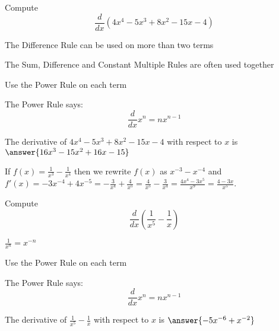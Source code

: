\documentclass[handout]{ximera}
\begin{document}
\begin{problem} %
  Compute 
  \[
  \frac{d}{dx} \left(4x^4 - 5x^3 + 8x^2 - 15x - 4\right)
  \]
  
    \begin{hint}
		  The Difference Rule can be used on more than two terms
		\end{hint}
		\begin{hint}
		  The Sum, Difference and Constant Multiple Rules are often used together 
		\end{hint}
		\begin{hint}
      Use the Power Rule on each term
    \end{hint}
    \begin{hint}
      The Power Rule says:
      \[
      \frac{d}{dx} x^n = nx^{n-1}
      \]
    \end{hint}    
		The derivative of $4x^4 - 5x^3 + 8x^2 - 15x - 4$ with respect to $x$ is
		 $\answer{16x^3 - 15x^2 + 16x - 15}$
	
\end{problem}


\begin{example} %
 If $f(x) = \frac{1}{x^3} - \frac{1}{x^4}$ then we rewrite $f(x)$ as $x^{-3} - x^{-4}$ and 
$f'(x) = -3x^{-4} + 4x^{-5} = -\frac{3}{x^4} + \frac{4}{x^5} = \frac{4}{x^5}-\frac{3}{x^4} = 
\frac{4x^4 - 3x^5}{x^9} = \frac{4 - 3x}{x^5}$.
\end{example}


\begin{problem} %
  Compute 
  \[
  \frac{d}{dx} \left(\frac{1}{x^5} - \frac{1}{x}\right)
  \]
  
    \begin{hint}
		 $\frac{1}{x^n} = x^{-n}$
		\end{hint}
		\begin{hint}
      Use the Power Rule on each term
    \end{hint}
    \begin{hint}
      The Power Rule says:
      \[
      \frac{d}{dx} x^n = nx^{n-1}
      \]
    \end{hint}    
		The derivative of $\frac{1}{x^5} - \frac{1}{x}$ with respect to $x$ is
		 $\answer{-5x^{-6} + x^{-2}}$
	
\end{problem}
\end{document}
